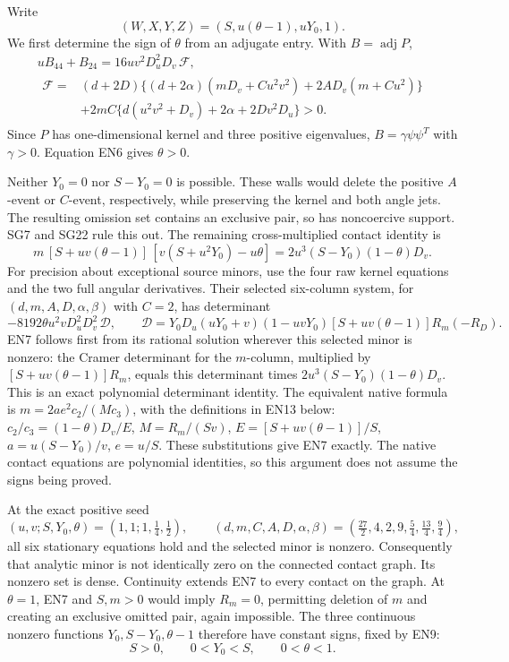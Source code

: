 Write
\[
 (W,X,Y,Z)=(S,u(\theta-1),uY_0,1).
 \tag{EN5}
\]
We first determine the sign of $\theta$ from an adjugate entry. With \(B=\operatorname{adj}P\),
\[
\begin{gathered}
 uB_{44}+B_{24}
 =16uv^2D_u^2D_v\,\mathcal F,\\
\begin{aligned}
 \mathcal F={}&(d+2D)\{(d+2\alpha)(mD_v+Cu^2v^2)
                       +2AD_v(m+Cu^2)\}\\
 &+2mC\{d(u^2v^2+D_v)+2\alpha+2Dv^2D_u\}>0 .
\end{aligned}
\end{gathered}\tag{EN6}
\]
Since \(P\) has one-dimensional kernel and three positive eigenvalues,
\(B=\gamma\psi\psi^T\) with \(\gamma>0\).  Equation EN6 gives
\(\theta>0\).

Neither \(Y_0=0\) nor \(S-Y_0=0\) is possible.  These walls would delete
the positive \(A\)-event or \(C\)-event, respectively, while preserving
the kernel and both angle jets.  The resulting omission set contains
an exclusive pair, so has noncoercive support.  SG7 and SG22 rule this out.
The remaining cross-multiplied contact identity is
\[
 m\,[S+uv(\theta-1)]\,
       [v(S+u^2Y_0)-u\theta]
   =2u^3(S-Y_0)(1-\theta)D_v .
 \tag{EN7}
\]
For precision about exceptional source minors, use the four raw kernel
equations and the two full angular derivatives.  Their selected six-column
system, for \((d,m,A,D,\alpha,\beta)\) with \(C=2\), has
determinant
\[
 -8192\theta u^2vD_u^2D_v^2\,\mathcal D,\qquad
 \mathcal D=Y_0D_u(uY_0+v)(1-uvY_0)
 [S+uv(\theta-1)]R_m(-R_D).
 \tag{EN8}
\]
EN7 follows first from its rational solution wherever this selected
minor is nonzero: the Cramer determinant for the \(m\)-column,
multiplied by \([S+uv(\theta-1)]R_m\), equals this determinant
times \(2u^3(S-Y_0)(1-\theta)D_v\).  This is an exact
polynomial determinant identity.  The equivalent native formula is
\(m=2ae^2c_2/(Mc_3)\), with the definitions in EN13 below:
\(c_2/c_3=(1-\theta)D_v/E\),
\(M=R_m/(Sv)\), \(E=[S+uv(\theta-1)]/S\),
\(a=u(S-Y_0)/v\), \(e=u/S\).  These substitutions give EN7
exactly.  The native contact equations are polynomial identities, so
this argument does not assume the signs being proved.

At the exact positive seed
\[
 (u,v;S,Y_0,\theta)=(1,1;1,\tfrac14,\tfrac12),\qquad
 (d,m,C,A,D,\alpha,\beta)
 =(\tfrac{27}2,4,2,9,\tfrac54,\tfrac{13}4,\tfrac94),
 \tag{EN9}
\]
all six stationary equations hold and the selected minor is nonzero.
Consequently that analytic minor is not identically zero on the
connected contact graph.  Its nonzero set is dense.  Continuity extends
EN7 to every contact on the graph.  At \(\theta=1\), EN7 and \(S,m>0\)
would imply \(R_m=0\), permitting deletion of \(m\) and creating an
exclusive omitted pair, again impossible.  The three continuous
nonzero functions \(Y_0,S-Y_0,\theta-1\) therefore have constant signs,
fixed by EN9:
\[
 S>0,\qquad 0<Y_0<S,\qquad 0<\theta<1.
 \tag{EN10}
\]

